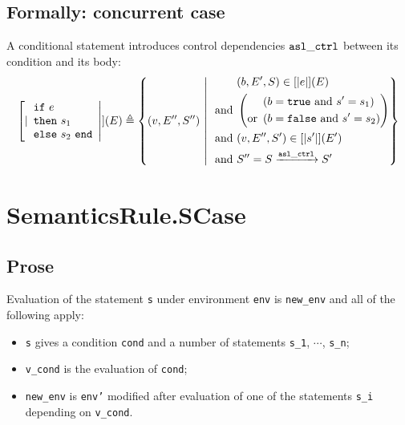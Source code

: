 \documentclass{book}
\begin{document}
\begin{formal}
  \subsection{Formally: concurrent case}
  A conditional statement introduces control dependencies $\mathtt{asl\_ctrl}$ between its
  condition and its body:
  \begin{align}
    \interp{\begin{array}{l}
      \syntt{if}\ e\\
      \syntt{then}\ s_1\\
      \syntt{else}\ s_2\ \syntt{end}
    \end{array}} (E) \triangleq
      \left\{ (v, E'', S'') \st{} \ 
      \begin{aligned}
        & (b, E', S) \in \interp{e} (E)
        \\ \text{and}\ &
        \left( \begin{aligned}
          & \left(b = \syntt{true}\ \text{and}\ s' = s_1 \right)
          \\ \text{or}\ &
          \left( b = \syntt{false}\ \text{and}\ s' = s_2 \right)
        \end{aligned} \right)
        \\ \text{and}\ &
        (v, E'', S') \in \interp{s'} (E')
        \\ \text{and}\ &
        S'' = S \xrightarrow{\aslctrl} S'
      \end{aligned}
      \right\}
    \label{eq:sem-conc-scond}
  \end{align}
\end{formal}


\section{SemanticsRule.SCase \label{sec:SemanticsRule.SCase}}

    \subsection{Prose}
  Evaluation of the statement \texttt{s} under environment \texttt{env} is
\texttt{new\_env} and all of the following apply:
    \begin{itemize}
    \item \texttt{s} gives a condition \texttt{cond} and a number of statements \texttt{s\_1}, $\cdots$, \texttt{s\_n};
    \item \texttt{v\_cond} is the evaluation of \texttt{cond};
    \item \texttt{new\_env} is \texttt{env'} modified after evaluation of one of the statements \texttt{s\_i} depending on \texttt{v\_cond}.
    \end{itemize}
\end{document}
